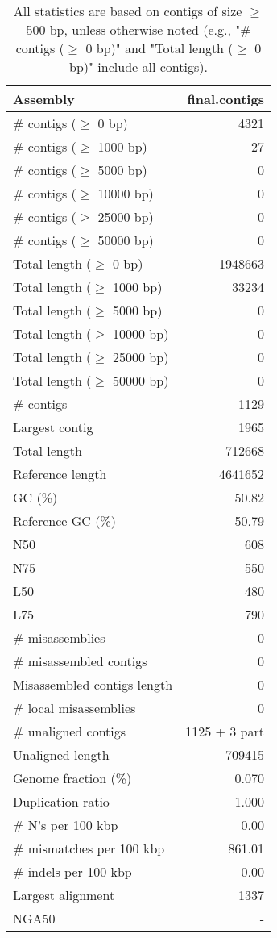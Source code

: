 \documentclass[12pt,a4paper]{article}
\begin{document}
\begin{table}[ht]
\begin{center}
\caption{All statistics are based on contigs of size $\geq$ 500 bp, unless otherwise noted (e.g., "\# contigs ($\geq$ 0 bp)" and "Total length ($\geq$ 0 bp)" include all contigs).}
\begin{tabular}{|l*{1}{|r}|}
\hline
Assembly & final.contigs \\ \hline
\# contigs ($\geq$ 0 bp) & 4321 \\ \hline
\# contigs ($\geq$ 1000 bp) & 27 \\ \hline
\# contigs ($\geq$ 5000 bp) & 0 \\ \hline
\# contigs ($\geq$ 10000 bp) & 0 \\ \hline
\# contigs ($\geq$ 25000 bp) & 0 \\ \hline
\# contigs ($\geq$ 50000 bp) & 0 \\ \hline
Total length ($\geq$ 0 bp) & 1948663 \\ \hline
Total length ($\geq$ 1000 bp) & 33234 \\ \hline
Total length ($\geq$ 5000 bp) & 0 \\ \hline
Total length ($\geq$ 10000 bp) & 0 \\ \hline
Total length ($\geq$ 25000 bp) & 0 \\ \hline
Total length ($\geq$ 50000 bp) & 0 \\ \hline
\# contigs & 1129 \\ \hline
Largest contig & 1965 \\ \hline
Total length & 712668 \\ \hline
Reference length & 4641652 \\ \hline
GC (\%) & 50.82 \\ \hline
Reference GC (\%) & 50.79 \\ \hline
N50 & 608 \\ \hline
N75 & 550 \\ \hline
L50 & 480 \\ \hline
L75 & 790 \\ \hline
\# misassemblies & 0 \\ \hline
\# misassembled contigs & 0 \\ \hline
Misassembled contigs length & 0 \\ \hline
\# local misassemblies & 0 \\ \hline
\# unaligned contigs & 1125 + 3 part \\ \hline
Unaligned length & 709415 \\ \hline
Genome fraction (\%) & 0.070 \\ \hline
Duplication ratio & 1.000 \\ \hline
\# N's per 100 kbp & 0.00 \\ \hline
\# mismatches per 100 kbp & 861.01 \\ \hline
\# indels per 100 kbp & 0.00 \\ \hline
Largest alignment & 1337 \\ \hline
NGA50 & - \\ \hline
\end{tabular}
\end{center}
\end{table}
\end{document}
